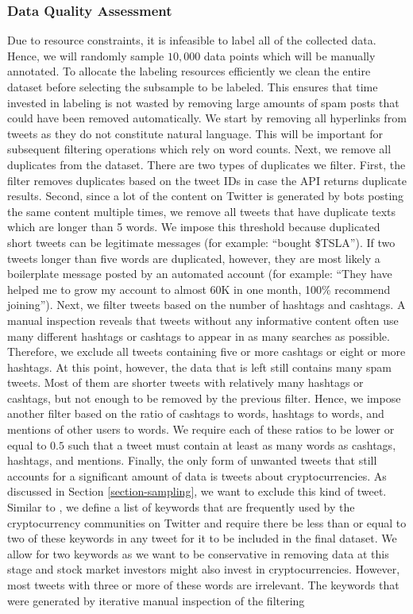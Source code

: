 \subsubsection{Data Quality Assessment}
\label{section-dataquality}
Due to resource constraints, it is infeasible to label all of the collected data. Hence, we will randomly sample $10,000$ data points which will be manually annotated. To allocate the labeling resources efficiently we clean the entire dataset before selecting the subsample to be labeled. This ensures that time invested in labeling is not wasted by removing large amounts of spam posts that could have been removed automatically.\newline
We start by removing all hyperlinks from tweets as they do not constitute natural language. This will be important for subsequent filtering operations which rely on word counts. Next, we remove all duplicates from the dataset. There are two types of duplicates we filter. First, the filter removes duplicates based on the tweet IDs in case the API returns duplicate results. Second, since a lot of the content on Twitter is generated by bots posting the same content multiple times, we remove all tweets that have duplicate texts which are longer than 5 words. We impose this threshold because duplicated short tweets can be legitimate messages (for example: ``bought \$TSLA''). If two tweets longer than five words are duplicated, however, they are most likely a boilerplate message posted by an automated account (for example: ``They have helped me to grow my account to almost 60K in one month, 100\% recommend joining''). Next, we filter tweets based on the number of hashtags and cashtags. A manual inspection reveals that tweets without any informative content often use many different hashtags or cashtags to appear in as many searches as possible. Therefore, we exclude all tweets containing five or more cashtags or eight or more hashtags. At this point, however, the data that is left still contains many spam tweets. Most of them are shorter tweets with relatively many hashtags or cashtags, but not enough to be removed by the previous filter. Hence, we impose another filter based on the ratio of cashtags to words, hashtags to words, and mentions of other users to words. We require each of these ratios to be lower or equal to $0.5$ such that a tweet must contain at least as many words as cashtags, hashtags, and mentions. Finally, the only form of unwanted tweets that still accounts for a significant amount of data is tweets about cryptocurrencies. As discussed in Section \ref{section-sampling}, we want to exclude this kind of tweet. Similar to , we define a list of keywords that are frequently used by the cryptocurrency communities on Twitter and require there be less than or equal to two of these keywords in any tweet for it to be included in the final dataset. We allow for two keywords as we want to be conservative in removing data at this stage and stock market investors might also invest in cryptocurrencies. However, most tweets with three or more of these words are irrelevant. The keywords that were generated by iterative manual inspection of the filtering 